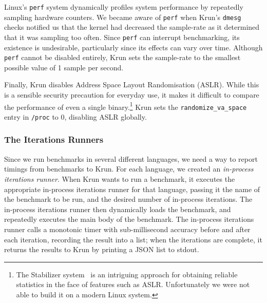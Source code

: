 \documentclass[a4paper,UKenglish]{lipics}
\newcommand{\krun}{Krun\xspace}
\begin{document}
Linux's \texttt{perf} system dynamically profiles system performance by
repeatedly sampling hardware counters. We became aware of \texttt{perf} when
\krun's \texttt{dmesg} checks notified us that the kernel had decreased the
sample-rate as it determined that it was sampling too often. Since \texttt{perf}
can interrupt benchmarking, its existence is undesirable, particularly since its
effects can vary over time. Although \texttt{perf} cannot be disabled entirely,
\krun sets the sample-rate to the smallest possible value of 1 sample per
second.

Finally, \krun disables Address Space Layout Randomisation (ASLR). While this is
a sensible security precaution for everyday use, it makes it difficult to
compare the performance of even a single binary.\footnote{The Stabilizer
system~\cite{curtsinger13stabilizer} is an intriguing approach for obtaining reliable
statistics in the face of features such as ASLR. Unfortunately we were not able
to build it on a modern Linux system.} \krun sets the
\texttt{randomize\_va\_space} entry in \texttt{/proc} to 0, disabling ASLR
globally.


%
%
%


\subsubsection{The Iterations Runners}

Since we run benchmarks in several different languages, we need a way to report
timings from benchmarks to \krun. For each language, we created an
\emph{in-process iterations runner}. When \krun wants to run a benchmark, it executes the
appropriate in-process iterations runner for that language, passing it the name of the
benchmark to be run, and the desired number of in-process iterations. The in-process iterations runner
then dynamically loads the benchmark, and repeatedly executes the main body of
the benchmark. The in-process iterations runner calls a monotonic timer with
sub-millisecond accuracy before and after each iteration, recording the result
into a list; when the iterations are complete, it returns the results
to \krun by printing a JSON list to stdout.
\end{document}
